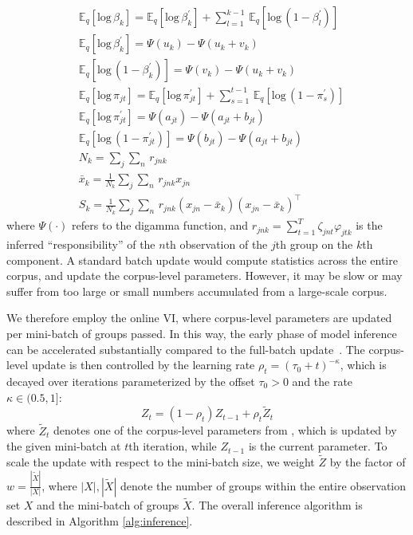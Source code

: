 \documentclass{article}
\begin{document}
\begin{align}\label{eq:expectations_and_suffstats}
    &\mathbb{E}_{q}[\text{log}\,\beta_{k}] = \mathbb{E}_{q}[\text{log}\,\beta_{k}^{\prime}] + \textstyle\sum_{l=1}^{k-1}\,\mathbb{E}_{q}[\text{log}\,(1 - \beta_{l}^{\prime})] \nonumber\\
    &\mathbb{E}_{q}[\text{log}\,\beta_{k}^{\prime}] = \Psi(u_{k}) - \Psi(u_{k} + v_{k}) \nonumber\\
    &\mathbb{E}_{q}[\text{log}\,(1 - \beta_{k}^{\prime})] = \Psi(v_{k}) - \Psi(u_{k} + v_{k}) \nonumber\\
    &\mathbb{E}_{q}[\text{log}\,\pi_{jt}] = \mathbb{E}_{q}[\text{log}\,\pi_{jt}^{\prime}] + \textstyle\sum_{s=1}^{t-1}\,\mathbb{E}_{q}[\text{log}\,(1 - \pi_{s}^{\prime})] \nonumber\\
    &\mathbb{E}_{q}[\text{log}\,\pi_{jt}^{\prime}] = \Psi(a_{jt}) - \Psi(a_{jt} + b_{jt}) \nonumber\\
    &\mathbb{E}_{q}[\text{log}\,(1 - \pi_{jt}^{\prime})] = \Psi(b_{jt}) - \Psi(a_{jt} + b_{jt}) \nonumber\\
    &N_{k} = \textstyle\sum_{j}\sum_{n}\,r_{jnk} \nonumber\\
    &\bar{x}_{k} = \frac{1}{N_{k}}\textstyle\sum_{j}\sum_{n}\,r_{jnk}x_{jn} \nonumber\\
    &S_{k} = \frac{1}{N_{k}}\textstyle\sum_{j}\sum_{n}\,r_{jnk}(x_{jn} - \bar{x}_{k})(x_{jn} - \bar{x}_{k})^{\intercal} \nonumber
\end{align}
where $\Psi(\cdot)$ refers to the digamma function, and $r_{jnk} = \sum_{t=1}^{T} \zeta_{jnt}\varphi_{jtk}$ is the inferred ``responsibility'' of the $n$th observation of the $j$th group on the $k$th component. A standard batch update would compute statistics across the entire corpus, and update the corpus-level parameters. However, it may be slow or may suffer from too large or small numbers accumulated from a large-scale corpus.

We therefore employ the online VI, where corpus-level parameters are updated per mini-batch of groups passed. In this way, the early phase of model inference can be accelerated substantially compared to the full-batch update~\cite{DBLP:journals/jmlr/WangPB11, DBLP:conf/nips/HoffmanBB10}. The corpus-level update is then controlled by the learning rate $\rho_{t} = (\tau_{0} + t)^{-\kappa}$, which is decayed over iterations parameterized by the offset $\tau_{0} > 0$ and the rate $\kappa \in (0.5, 1]$:
\begin{equation}\label{eq:minibatch_update}
    Z_{t} = (1 - \rho_{t})Z_{t - 1} + \rho_{t}\tilde{Z}_{t}
\end{equation}
where $\tilde{Z}_{t}$ denotes one of the corpus-level parameters from , which is updated by the given mini-batch at $t$th iteration, while $Z_{t-1}$ is the current parameter. To scale the update with respect to the mini-batch size, we weight $\tilde{Z}$ by the factor of $w = \frac{|\tilde{X}|}{|X|}$, where $|X|, |\tilde{X}|$ denote the number of groups within the entire observation set $X$ and the mini-batch of groups $\tilde{X}$. The overall inference algorithm is described in Algorithm \ref{alg:inference}.
\end{document}
